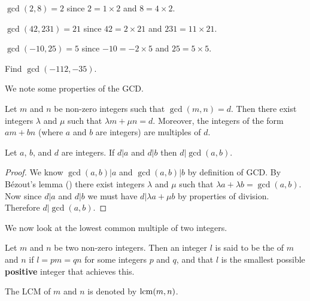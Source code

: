 \begin{example}
    $\gcd(2, 8) = 2$ since $2 = 1 \times 2$ and $8 = 4 \times 2$.
\end{example}

\begin{example}
    $\gcd(42, 231) = 21$ since $42 = 2 \times 21$ and $231 = 11 \times 21$.
\end{example}

\begin{example}
    $\gcd(-10, 25) = 5$ since $-10 = -2 \times 5$ and $25 = 5 \times 5$.
\end{example}

\begin{exercise}
    Find $\gcd(-112, -35)$.
\end{exercise}

We note some properties of the GCD.
\begin{lemma}[B\'{e}zout]\label{lemma-bezout}
    Let $m$ and $n$ be non-zero integers such that $\gcd(m, n) = d$. Then there exist integers $\lambda$ and $\mu$ such that $\lambda m + \mu n = d$. Moreover, the integers of the form $am + bn$ (where $a$ and $b$ are integers) are multiples of $d$.
\end{lemma}

\begin{proposition}\label{prop-gcd-divides-common-divisor}
    Let $a$, $b$, and $d$ are integers. If $d \vert a$ and $d \vert b$ then $d \vert \gcd(a, b)$.
\end{proposition}
\begin{proof}
    We know $\gcd(a,b) \vert a$ and $\gcd(a,b) \vert b$ by definition of GCD. By B\'{e}zout's lemma () there exist integers $\lambda$ and $\mu$ such that $\lambda a + \lambda b = \gcd(a,b)$. Now since $d \vert a$ and $d \vert b$ we must have $d \vert \lambda a + \mu b$ by properties of division. Therefore $d \vert \gcd(a,b)$.
\end{proof}

We now look at the lowest common multiple of two integers.



\begin{definition}
    Let $m$ and $n$ be two non-zero integers. Then an integer $l$ is said to be the  of $m$ and $n$ if $l = pm = qn$ for some integers $p$ and $q$, and that $l$ is the smallest possible \textbf{positive} integer that achieves this.

    The LCM of $m$ and $n$ is denoted by $\mathrm{lcm}(m,n)$.
\end{definition}

